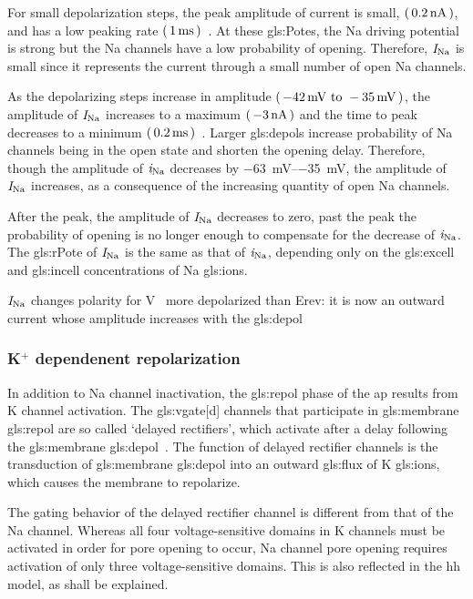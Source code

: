 \documentclass[class={myRUCProject}, crop=false]{standalone}
\begin{document}
For small depolarization steps, the peak amplitude of current is small, \(\left(\,\qty{0.2}{\nano\ampere}\,\right)\), and has a low peaking rate \(\left(\,\qty{1}{\milli\second}\,\right)\)~\cite{Hammond2015ch4}. At these \glspl{gls:Pote}, the \gls{Na} driving potential is strong but the \gls{Na} channels have a low probability of opening. Therefore, \(\mathit{I}_\mathrm{Na}\) is small since it represents the current through a small number of open \gls{Na} channels. 

As the depolarizing steps increase in amplitude \(\br{\qtyrange{-42}{-35}{\mV}}\), the amplitude of \(\mathit{I}_\mathrm{Na}\) increases to a maximum \(\br{\qty{-3}{\nA}}\) and the time to peak decreases to a minimum \(\br{\qty{0.2}{\ms}}\)~\cite{Hammond2015ch4}. 
Larger \glspl{gls:depol} increase probability of \gls{Na} channels being in the open state and shorten the opening delay. 
Therefore, though the amplitude of \(\mathit{i}_\mathrm{Na}\) decreases by \qtyrange{-63}{-35}{\mV}, the amplitude of \(\mathit{I}_\mathrm{Na}\) increases, as a consequence of the increasing quantity of open \gls{Na} channels. 

After the peak, the amplitude of \(\mathit{I}_\mathrm{Na}\) decreases to zero, past the peak the probability of opening is no longer enough to compensate for the decrease of \(\mathit{i}_\mathrm{Na}\). 
The \gls{gls:rPote} of \(\mathit{I}_\mathrm{Na}\) is the same as that of \(\mathit{i}_\mathrm{Na}\), depending only on the \gls{gls:excell} and \gls{gls:incell} concentrations of \gls{Na} \glspl{gls:ion}.

\(\mathit{I}_\mathrm{Na}\) changes polarity for \unit{\V\membrane} more depolarized than Erev: it is now an outward current whose amplitude increases with the \gls{gls:depol} 

\subsubsection{K\(^+\) dependenent repolarization}

In addition to \gls{Na} channel inactivation, the \gls{gls:repol} phase of the \gls{ap} results from \gls{K} channel activation. The \gls{gls:vgate}[d] channels that participate in \gls{gls:membrane} \gls{gls:repol} are so called `delayed rectifiers', which activate after a delay following the \gls{gls:membrane} \gls{gls:depol}~\cite{Hammond2015ch4}. The function of delayed rectifier channels is the transduction of \gls{gls:membrane} \gls{gls:depol} into an outward \gls{gls:flux} of \gls{K} \glspl{gls:ion}, which causes the membrane to repolarize. 

The gating behavior of the delayed rectifier channel is different from that of the \gls{Na} channel. Whereas all four voltage-sensitive domains in \gls{K} channels must be activated in order for pore opening to occur, \gls{Na} channel pore opening requires activation of only three voltage-sensitive domains\cite{Hammond2015ch4}. This is also reflected in the \gls{hh} model, as shall be explained. 
\end{document}
